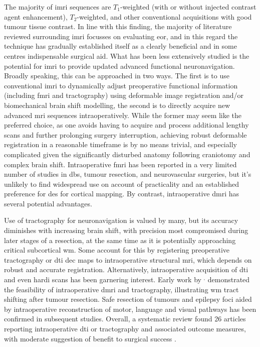 The majority of \gls{imri} sequences are $T_1$-weighted (with or without injected contrast agent enhancement), $T_2$-weighted, and other conventional acquisitions with good tumour tissue contrast\autocite{Kubben2011,Coburger2019}.
In line with this finding, the majority of literature reviewed surrounding \gls{imri} focusses on evaluating \gls{eor}, and in this regard the technique has gradually established itself as a clearly beneficial and in some centres indispensable surgical aid\autocite{Garzon-Muvdi2019,Hlavac2020}.
What has been less extensively studied is the potential for \gls{imri} to provide updated advanced functional neuronavigation.
Broadly speaking, this can be approached in two ways.
The first is to use conventional \gls{imri} to dynamically adjust preoperative functional information (including \gls{fmri} and tractography) using deformable image registration and/or biomechanical brain shift modelling, the second is to directly acquire new advanced \gls{mri} sequences intraoperatively.
While the former may seem like the preferred choice, as one avoids having to acquire and process additional lengthy scans and further prolonging surgery interruption, achieving robust deformable registration in a reasonable timeframe is by no means trivial, and especially complicated given the significantly disturbed anatomy following craniotomy and complex brain shift. 
Intraoperative \gls{fmri} has been reported in a very limited number of studies in \gls{dbs}\autocite{Hiss2015,Knight2015}, tumour resection\autocite{Roder2016a,Qiu2017a}, and neurovascular\autocite{Muscas2019} surgeries, but it's unlikely to find widespread use on account of practicality and an established preference for \gls{des} for cortical mapping.
By contrast, intraoperative \gls{dmri} has several potential advantages.

Use of tractography for neuronavigation is valued by many, but its accuracy diminishes with increasing brain shift, with precision most compromised during later stages of a resection, at the same time as it is potentially approaching critical subcortical \gls{wm}\autocite{Yang2019}.
Some account for this by registering preoperative tractography or \gls{dti} \gls{dec} maps to intraoperative structural \gls{mri}\autocite{Nimsky2006a,Tamura2022}, which depends on robust and accurate registration\autocite{Beare2016}.
Alternatively, intraoperative acquisition of \gls{dti} and even \gls{hardi} scans has been garnering interest.
Early work by \textcite{Nimsky2005}$^,$\autocite{Nimsky2005a} demonstrated the feasibility of intraoperative \gls{dmri} and tractography, illustrating \gls{wm} tract shifting after tumour resection.
Safe resection of tumours and epilepsy foci aided by intraoperative reconstruction of motor\autocite{Maesawa2010,Javadi2017}, language\autocite{DAndrea2016,Li2021} and visual\autocite{Daga2012,Cui2015} pathways has been confirmed in subsequent studies.
Overall, a systematic review found 26 articles reporting intraoperative \gls{dti} or tractography and associated outcome measures, with moderate suggestion of benefit to surgical success .

